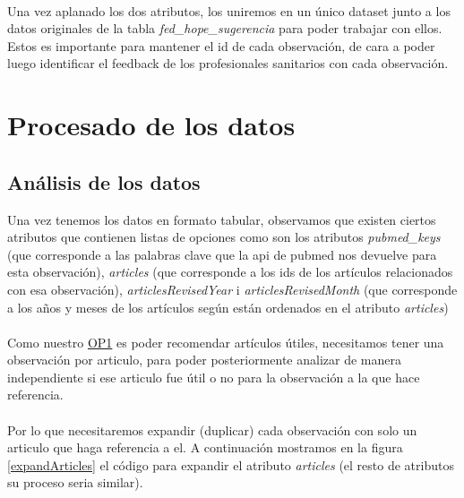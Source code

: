 \documentclass[10pt,a4paper,oneside]{book}
\begin{document}
\paragraph{}
Una vez aplanado los dos atributos, los uniremos en un único dataset junto a los datos originales de la tabla \textit{fed\_hope\_sugerencia} para poder trabajar con ellos. Estos es importante para mantener el id de cada observación, de cara a poder luego identificar el feedback de los profesionales sanitarios con cada observación.

\newpage
\section{Procesado de los datos}

\subsection{Análisis de los datos}
Una vez tenemos los datos en formato tabular, observamos que existen ciertos atributos que contienen listas de opciones como son los atributos \textit{pubmed\_keys} (que corresponde a las palabras clave que la api de pubmed nos devuelve para esta observación), \textit{articles} (que corresponde a los ids de los artículos relacionados con esa observación), \textit{articlesRevisedYear} i \textit{articlesRevisedMonth} (que corresponde a los años y meses de los artículos según están ordenados en el atributo \textit{articles})

\paragraph{}
Como nuestro \hyperref[op:OP1]{OP1} es poder recomendar artículos útiles, necesitamos tener una observación por articulo, para poder posteriormente analizar de manera independiente si ese articulo fue útil o no para la observación a la que hace referencia.

\paragraph{}
Por lo que necesitaremos expandir (duplicar) cada observación con solo un articulo que haga referencia a el. A continuación mostramos en la figura \ref{expandArticles} el código para expandir el atributo \textit{articles} (el resto de atributos su proceso seria similar).
\end{document}
